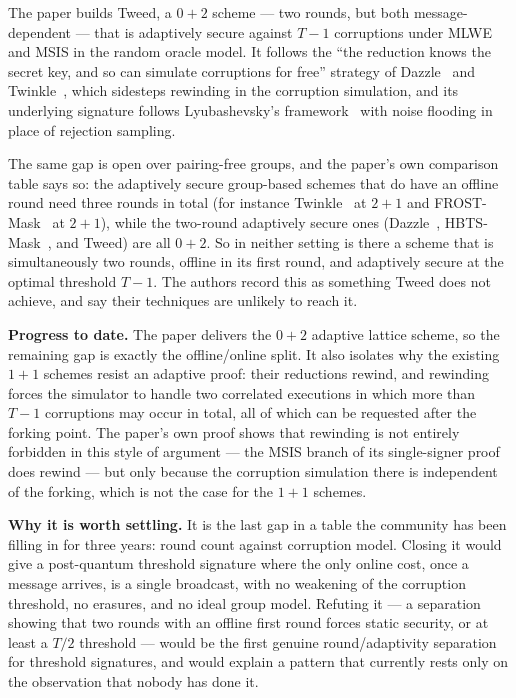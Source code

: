 \documentclass{aicr-conjecture}
\begin{document}
The paper builds Tweed, a $0+2$ scheme --- two rounds, but both
message-dependent --- that is adaptively secure against $T-1$
corruptions under MLWE and MSIS in the random oracle model. It follows
the ``the reduction knows the secret key, and so can simulate
corruptions for free'' strategy of Dazzle~\cite{Che25a} and
Twinkle~\cite{BLT24}, which sidesteps rewinding in the corruption
simulation, and its underlying signature follows Lyubashevsky's
framework~\cite{Lyu12} with noise flooding in place of rejection
sampling.

The same gap is open over pairing-free groups, and the paper's own
comparison table says so: the adaptively secure group-based schemes
that do have an offline round need three rounds in total (for instance
Twinkle~\cite{BLT24} at $2+1$ and FROST-Mask~\cite{Che25b} at $2+1$),
while the two-round adaptively secure ones (Dazzle~\cite{Che25a},
HBTS-Mask~\cite{Che25b}, and Tweed) are all $0+2$. So in neither
setting is there a scheme that is simultaneously two rounds, offline in
its first round, and adaptively secure at the optimal threshold $T-1$.
The authors record this as something Tweed does not achieve, and say
their techniques are unlikely to reach it.

\smallskip\noindent\textbf{Progress to date.} The paper delivers the
$0+2$ adaptive lattice scheme, so the remaining gap is exactly the
offline/online split. It also isolates why the existing $1+1$ schemes
resist an adaptive proof: their reductions rewind, and rewinding forces
the simulator to handle two correlated executions in which more than
$T-1$ corruptions may occur in total, all of which can be requested
after the forking point. The paper's own proof shows that rewinding is
not entirely forbidden in this style of argument --- the MSIS branch of
its single-signer proof does rewind --- but only because the corruption
simulation there is independent of the forking, which is not the case
for the $1+1$ schemes.

\smallskip\noindent\textbf{Why it is worth settling.} It is the last
gap in a table the community has been filling in for three years: round
count against corruption model. Closing it would give a post-quantum
threshold signature where the only online cost, once a message arrives,
is a single broadcast, with no weakening of the corruption threshold,
no erasures, and no ideal group model. Refuting it --- a separation
showing that two rounds with an offline first round forces static
security, or at least a $T/2$ threshold --- would be the first genuine
round/adaptivity separation for threshold signatures, and would explain
a pattern that currently rests only on the observation that nobody has
done it.
\end{document}
